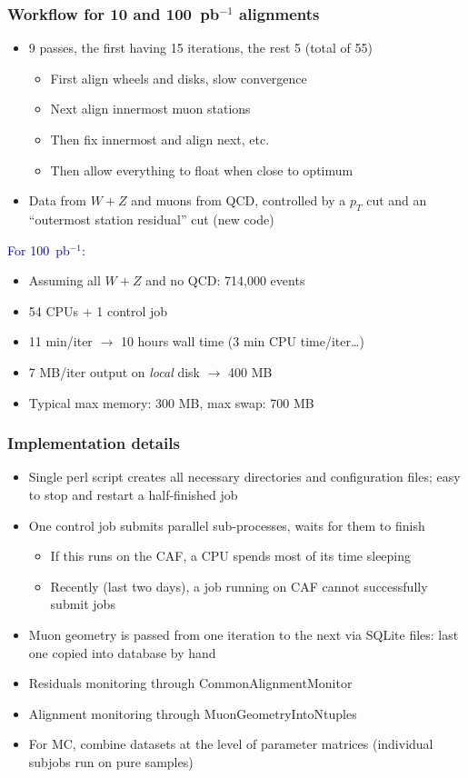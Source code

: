 \documentclass[compress]{beamer}
\begin{document}
\begin{frame}
\frametitle{Workflow for 10 and 100~pb$^{-1}$ alignments}
\begin{itemize}
\item 9 passes, the first having 15 iterations, the rest 5 (total of 55)
\begin{itemize}
\item First align wheels and disks, slow convergence
\item Next align innermost muon stations
\item Then fix innermost and align next, etc.
\item Then allow everything to float when close to optimum
\end{itemize}
\item Data from $W+Z$ and muons from QCD, controlled by a $p_T$ cut
and an ``outermost station residual'' cut (new code)
\end{itemize}

\textcolor{darkblue}{For 100~pb$^{-1}$:}
\begin{itemize}
\item Assuming all $W+Z$ and no QCD: 714,000 events
\item 54 CPUs + 1 control job
\item 11 min/iter $\to$ 10 hours wall time (3 min CPU time/iter\ldots)
\item 7 MB/iter output on {\it local} disk $\to$ 400 MB
\item Typical max memory: 300 MB, max swap: 700 MB
\end{itemize}
\end{frame}

\begin{frame}
\frametitle{Implementation details}
\begin{itemize}\setlength{\itemsep}{0.2 cm}
\item Single perl script creates all necessary directories and
configuration files; easy to stop and restart a half-finished job
\item One control job submits parallel sub-processes, waits for them to finish
\begin{itemize}
\item If this runs on the CAF, a CPU spends most of its time sleeping
\item Recently (last two days), a job running on CAF cannot successfully submit jobs
\end{itemize}

\item Muon geometry is passed from one iteration to the next via
SQLite files: last one copied into database by hand

\item Residuals monitoring through CommonAlignmentMonitor

\item Alignment monitoring through MuonGeometryIntoNtuples

\item For MC, combine datasets at the level of parameter matrices
(individual subjobs run on pure samples)
\end{itemize}
\end{frame}
\end{document}
